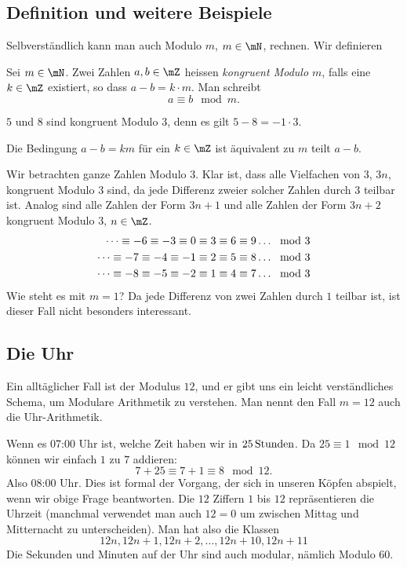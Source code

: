 \documentclass[%
11pt,%
twoside,%
titlepage,%
german,%
headsepline%
]{scrartcl}
\begin{document}
\subsection{Definition und weitere Beispiele}

Selbverständlich kann man auch Modulo $m$, $m\in\mN$, rechnen. Wir definieren

\begin{cdef}[Modulo]{}
Sei $m\in\mN$. Zwei Zahlen $a,b\in\mZ$ heissen \emph{kongruent Modulo $m$}, falls eine $k\in\mZ$ existiert, so dass $a-b=k\cdot m$. Man schreibt
$$a\equiv b\mod m.$$
\end{cdef}

\begin{bsp}
$5$ und $8$ sind kongruent Modulo $3$, denn es gilt $5-8=-1\cdot 3$.
\end{bsp}

\begin{bem}
Die Bedingung $a-b=km$ für ein $k\in\mZ$ ist äquivalent zu $m$ teilt $a-b$.
\end{bem}

Wir betrachten ganze Zahlen Modulo $3$. Klar ist, dass alle Vielfachen von $3$, $3n$, kongruent Modulo $3$ sind, da jede Differenz zweier solcher Zahlen durch $3$ teilbar ist. Analog sind alle Zahlen der Form $3n+1$ und alle Zahlen der Form $3n+2$ kongruent Modulo $3$, $n\in\mZ$.
\begin{align}
\dots\equiv-6\equiv-3\equiv0\equiv3\equiv6\equiv9\dots\mod3\notag\\
\dots\equiv-7\equiv-4\equiv-1\equiv2\equiv5\equiv8\dots\mod3\notag\\
\dots\equiv-8\equiv-5\equiv-2\equiv1\equiv4\equiv7\dots\mod3\notag
\end{align}
Wie steht es mit $m=1$? Da jede Differenz von zwei Zahlen durch $1$ teilbar ist, ist dieser Fall nicht besonders interessant.

\subsection{Die Uhr}

Ein alltäglicher Fall ist der Modulus $12$, und er gibt uns ein leicht verständliches Schema, um Modulare Arithmetik zu verstehen. Man nennt den Fall $m=12$ auch die \glqq Uhr-Arithmetik\grqq.

\begin{bsp}
Wenn es 07:00 Uhr ist, welche Zeit haben wir in $\unit[25]{Stunden}$. Da $25\equiv1\mod12$ können wir einfach $1$ zu $7$ addieren:
$$7+25\equiv7+1\equiv8\mod12.$$
Also 08:00 Uhr. Dies ist formal der Vorgang, der sich in unseren Köpfen abspielt, wenn wir obige Frage beantworten. Die $12$ Ziffern $1$ bis $12$ repräsentieren die Uhrzeit (manchmal verwendet man auch $12=0$ um zwischen Mittag und Mitternacht zu unterscheiden). Man hat also die Klassen
$$12n,12n+1,12n+2,\dots,12n+10,12n+11$$
Die Sekunden und Minuten auf der Uhr sind auch modular, nämlich Modulo $60$.
\end{bsp}
\end{document}
